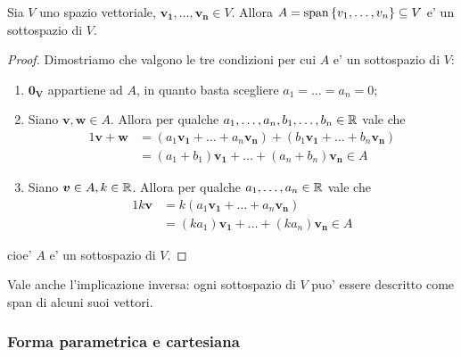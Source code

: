 \begin{proposition}
    Sia $V$ uno spazio vettoriale, $\bm{v_1}, \dots, \bm{v_n} \in V$. Allora $A = \operatorname{span}\left\{v_1, \dots, v_n\right\} \subseteq V$ e' un sottospazio di $V$.
\end{proposition}
\begin{proof}
    Dimostriamo che valgono le tre condizioni per cui $A$ e' un sottospazio di $V$:
    \begin{enumerate}
        \item $\bm{0_V}$ appartiene ad $A$, in quanto basta scegliere $a_1 = \dots = a_n = 0$;
        \item Siano $\bm{v}, \bm{w} \in A$. Allora per qualche $a_1, \dots, a_n, b_1, \dots, b_n \in \mathbb{R}$ vale che \begin{alignat*}{1}
            \bm{v} + \bm{w} &= (a_1\bm{v_1} + \dots + a_n\bm{v_n}) + (b_1\bm{v_1} + \dots + b_n\bm{v_n}) \\
            &= (a_1 + b_1)\bm{v_1} + \dots + (a_n + b_n)\bm{v_n} \in A
        \end{alignat*}
        \item Siano $\bm{v} \in A, k \in \mathbb{R}$. Allora per qualche $a_1, \dots, a_n \in \mathbb{R}$ vale che \begin{alignat*}{1}
            k\bm{v} &= k(a_1\bm{v_1} + \dots + a_n\bm{v_n})  \\
            &= (ka_1)\bm{v_1} + \dots + (ka_n)\bm{v_n} \in A
        \end{alignat*}
    \end{enumerate}
    cioe' $A$ e' un sottospazio di $V$.
\end{proof}

Vale anche l'implicazione inversa: ogni sottospazio di $V$ puo' essere descritto come span di alcuni suoi vettori.

\subsubsection{Forma parametrica e cartesiana}

